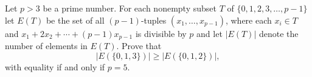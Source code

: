 Let $p > 3$ be a prime number. For each nonempty subset $T$ of $\{0, 1, 2, 3, \ldots, p-1\}$ let $E(T)$ be the set of all $(p-1)$-tuples $(x_1, \ldots, x_{p-1})$, where each $x_i \in T$ and $x_1 + 2x_2 + \cdots + (p-1)x_{p-1}$ is divisible by $p$ and let $|E(T)|$ denote the number of elements in $E(T)$. Prove that
\[ |E(\{0, 1, 3\})| \geq |E(\{0, 1, 2\})|, \]
with equality if and only if $p = 5$.
